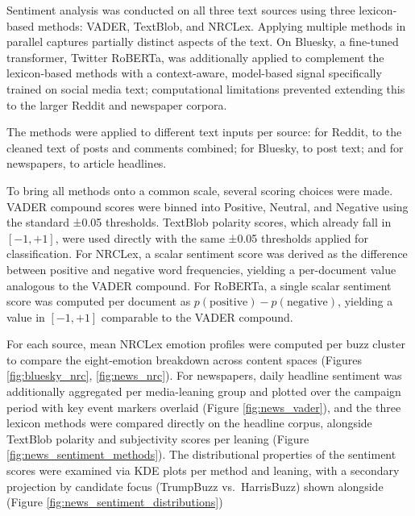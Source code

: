 Sentiment analysis was conducted on all three text sources using three lexicon-based methods: VADER, TextBlob, and NRCLex. Applying multiple methods in parallel captures partially distinct aspects of the text. On Bluesky, a fine-tuned transformer, Twitter RoBERTa, was additionally applied to complement the lexicon-based methods with a context-aware, model-based signal specifically trained on social media text; computational limitations prevented extending this to the larger Reddit and newspaper corpora.

The methods were applied to different text inputs per source: for Reddit, to the cleaned text of posts and comments combined; for Bluesky, to post text; and for newspapers, to article headlines.

To bring all methods onto a common scale, several scoring choices were made. VADER compound scores were binned into Positive, Neutral, and Negative using the standard ±0.05 thresholds. TextBlob polarity scores, which already fall in $[-1, +1]$, were used directly with the same ±0.05 thresholds applied for classification. For NRCLex, a scalar sentiment score was derived as the difference between positive and negative word frequencies, yielding a per-document value analogous to the VADER compound. For RoBERTa, a single scalar sentiment score was computed per document as $p(\text{positive}) - p(\text{negative})$, yielding a value in $[-1, +1]$ comparable to the VADER compound.

For each source, mean NRCLex emotion profiles were computed per buzz cluster to compare the eight-emotion breakdown across content spaces (Figures \ref{fig:bluesky_nrc}, \ref{fig:news_nrc}). For newspapers, daily headline sentiment was additionally aggregated per media-leaning group and plotted over the campaign period with key event markers overlaid (Figure \ref{fig:news_vader}), and the three lexicon methods were compared directly on the headline corpus, alongside TextBlob polarity and subjectivity scores per leaning (Figure \ref{fig:news_sentiment_methods}). The distributional properties of the sentiment scores were examined via KDE plots per method and leaning, with a secondary projection by candidate focus (TrumpBuzz vs.\ HarrisBuzz) shown alongside (Figure \ref{fig:news_sentiment_distributions})
